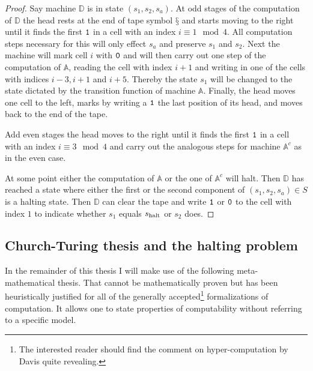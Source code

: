 \begin{proof}
  Say machine \(\mathbb{D}\) is in state \((s_1, s_2, s_a)\). At odd stages of
  the computation of \(\mathbb{D}\) the head rests at the end of tape symbol
  \(§\) and starts moving to the right until it finds the first \(\mathtt{1}\) in a
  cell with an index \(i \equiv 1 \mod 4\). All computation steps necessary for
  this will only effect \(s_a\) and preserve \(s_1\) and \(s_2\).
  Next the machine will mark cell \(i\) with \(\mathtt{0}\) and will then carry out
  one step of the computation of \(\mathbb{A}\), reading the cell with index \(i
  + 1\) and writing in one of the cells with indices \(i - 3, i + 1\) and \(i +
  5\). Thereby the state \(s_1\) will be changed to the state dictated by the
  transition function of machine \(\mathbb{A}\).
  Finally, the head moves one cell to the left, marks by writing a \(\mathtt{1}\) the
  last position of its head, and moves back to the end of the tape.

  Add even stages the head moves to the right until it finds the first \(\mathtt{1}\)
  in a cell with an index \(i \equiv 3 \mod 4\) and carry out the analogous
  steps for machine \(\mathbb{A}^c\) as in the even case.

  At some point either the computation of \(\mathbb{A}\) or the one of
  \(\mathbb{A}^c\) will halt. Then \(\mathbb{D}\) has reached a state where
  either the first or the second component of \((s_1, s_2, s_a) ∈ S\) is a
  halting state. Then \(\mathbb{D}\) can clear the tape and write \(\mathtt{1}\) or
  \(\mathtt{0}\) to the cell with index \(1\) to indicate whether \(s_1\) equals
  \(s_{\text{halt}}\) or \(s_2\) does.
\end{proof}

\subsection{Church-Turing thesis and the halting problem}

In the remainder of this thesis I will make use of the following
meta-mathematical thesis. That cannot be mathematically proven but has been
heuristically justified for all of the generally accepted\footnote{The
interested reader should find the comment \cite{Davis2006} on hyper-computation
by Davis quite revealing.} formalizations of computation. It allows one to state
properties of computability without referring to a specific model.

